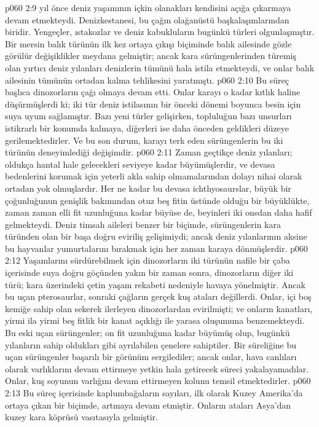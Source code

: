 \vs p060 2:9  yıl önce deniz yaşamının içkin olanakları kendisini açığa çıkarmaya devam etmekteydi. Denizkestanesi, bu çağın olağanüstü başkalaşımlarından biridir. Yengeçler, ıstakozlar ve deniz kabukluların bugünkü türleri olgunlaşmıştır. Bir mersin balık türünün ilk kez ortaya çıkışı biçiminde balık ailesinde gözle görülür değişiklikler meydana gelmiştir; ancak kara sürüngenlerinden türemiş olan yırtıcı deniz yılanları denizlerin tümünü hala istila etmekteydi, ve onlar balık ailesinin tümünün ortadan kalma tehlikesini yaratmıştı.
\vs p060 2:10 Bu süreç başlıca dinozorların çağı olmaya devam etti. Onlar karayı o kadar kıtlık haline düşürmüşlerdi ki; iki tür deniz istilasının bir önceki dönemi boyunca besin için suya uyum sağlamıştır. Bazı yeni türler gelişirken, topluluğun bazı unsurları istikrarlı bir konumda kalmaya, diğerleri ise daha önceden geldikleri düzeye gerilemektedirler. Ve bu son durum, karayı terk eden sürüngenlerin bu iki türünün deneyimlediği değişimdir.
\vs p060 2:11 Zaman geçtikçe deniz yılanları; oldukça hantal hale gelecekleri seviyeye kadar büyümüşlerdir, ve devasa bedenlerini korumak için yeterli akla sahip olmamalarından dolayı nihai olarak ortadan yok olmuşlardır. Her ne kadar bu devasa ichthyosaurslar, büyük bir çoğunluğunun genişlik bakımından otuz beş fitin üstünde olduğu bir büyüklükte, zaman zaman elli fit uzunluğuna kadar büyüse de, beyinleri iki onsdan daha hafif gelmekteydi. Deniz timsah aileleri benzer bir biçimde, sürüngenlerin kara türünden olan bir başa doğru eviriliş gelişimiydi; ancak deniz yılanlarının aksine bu hayvanlar yumurtalarını bırakmak için her zaman karaya dönmüşlerdir.
\vs p060 2:12 Yaşamlarını sürdürebilmek için dinozorların iki türünün nafile bir çaba içerisinde suya doğru göçünden yakın bir zaman sonra, dinozorların diğer iki türü; kara üzerindeki çetin yaşam rekabeti nedeniyle havaya yönelmiştir. Ancak bu uçan pterosaurlar, sonraki çağların gerçek kuş ataları değillerdi. Onlar, içi boş kemiğe sahip olan sekerek ilerleyen dinozorlardan evirilmişti; ve onların kanatları, yirmi ila yirmi beş fitlik bir kanat açıklığı ile yarasa oluşumuna benzemekteydi. Bu eski uçan sürüngenler; on fit uzunluğuna kadar büyümüş olup, bugünkü yılanların sahip oldukları gibi ayrılabilen çenelere sahiptiler. Bir süreliğine bu uçan sürüngenler başarılı bir görünüm sergilediler; ancak onlar, hava canlıları olarak varlıklarını devam ettirmeye yetkin hala getirecek süreci yakalayamadılar. Onlar, kuş soyunun varlığını devam ettirmeyen kolunu temsil etmektedirler.
\vs p060 2:13 Bu süreç içerisinde kaplumbağaların sayıları, ilk olarak Kuzey Amerika’da ortaya çıkan bir biçimde, artmaya devam etmiştir. Onların ataları Asya’dan kuzey kara köprüsü vasıtasıyla gelmiştir.
